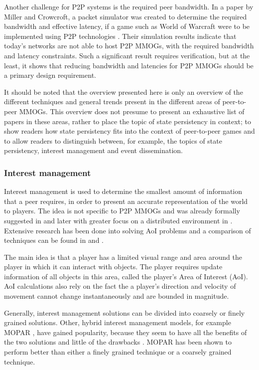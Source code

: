 \documentclass[10pt,a4paper,journal,cspaper,compsoc]{IEEEtran}
\begin{document}
Another challenge for P2P systems is the required peer bandwidth. In a paper by Miller and Crowcroft, a packet simulator was created to determine the
required bandwidth and effective latency, if a game such as World of Warcraft were to be implemented using P2P technologies
\cite{Miller_p2p_infeasability}. Their simulation results indicate that today's networks are not able to host P2P MMOGs, with the required bandwidth
and latency constraints. Such a significant result requires verification, but at the least, it shows that reducing bandwidth and latencies for P2P
MMOGs should be a primary design requirement.

It should be noted that the overview presented here is only an overview of the different techniques and general trends present in the different areas
of peer-to-peer MMOGs. This overview does not presume to present an exhaustive list of papers in these areas, rather to place the topic of state
persistency in context; to show readers how state persistency fits into the context of peer-to-peer games and to allow readers to distinguish
between, for example, the topics of state persistency, interest management and event dissemination.

\subsubsection{Interest management}
\label{key_challenges_im}

Interest management is used to determine the smallest amount of information that a peer requires, in order to present an accurate representation of
the world to players. The idea is not specific to P2P MMOGs and was already formally suggested in \cite{First_IM} and later with greater focus on a
distributed environment in \cite{Whang_agent_based_IM}. Extensive research has been done into solving AoI problems and a comparison of techniques can
be found in \cite{Boulanger_IM_compare} and \cite{IM_and_ED_survey_Krause}.

The main idea is that a player has a limited visual range and area around the player in which it can interact with objects. The player requires
update information of all objects in this area, called the player's Area of Interest (AoI). AoI calculations also rely on the fact the a player's
direction and velocity of movement cannot change instantaneously and are bounded in magnitude.

Generally, interest management solutions can be divided into coarsely or finely grained solutions. Other, hybrid interest management models, for
example MOPAR \cite{MOPAR}, have gained popularity, because they seem to have all the benefits of the two solutions and little of the drawbacks
\cite{hybrid_IM}. MOPAR has been shown to perform better than either a finely grained technique or a coarsely grained technique.
\end{document}
